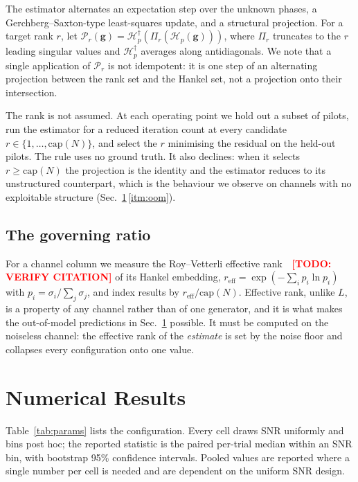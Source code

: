\documentclass[journal]{IEEEtran}
\newcommand{\todo}[1]{\textcolor{red}{\textbf{[TODO: #1]}}}
\newcommand{\bg}{\mathbf{g}}
\newcommand{\Hank}{\mathcal{H}}
\newcommand{\reff}{r_{\mathrm{eff}}}
\begin{document}
The estimator alternates an expectation step over the unknown phases, a
Gerchberg--Saxton-type least-squares update, and a structural projection. For
a target rank $r$, let $\mathcal{P}_r(\bg)=\Hank_p^{\dagger}\!\left(
\Pi_r\!\left(\Hank_p(\bg)\right)\right)$, where $\Pi_r$ truncates to the $r$
leading singular values and $\Hank_p^{\dagger}$ averages along
antidiagonals. We note that a single application of $\mathcal{P}_r$ is not
idempotent: it is one step of an alternating projection between the rank set
and the Hankel set, not a projection onto their intersection.

The rank is not assumed. At each operating point we hold out a subset of
pilots, run the estimator for a reduced iteration count at every candidate
$r\in\{1,\dots,\mathrm{cap}(N)\}$, and select the $r$ minimising the residual
on the held-out pilots. The rule uses no ground truth. It also declines: when
it selects $r\ge \mathrm{cap}(N)$ the projection is the identity and the
estimator reduces to its unstructured counterpart, which is the behaviour we
observe on channels with no exploitable structure
(Sec.~\ref{sec:results}\,\ref{itm:oom}).

\subsection{The governing ratio}

For a channel column we measure the Roy--Vetterli effective
rank~\cite{royvetterli2007}~\todo{VERIFY CITATION} of its Hankel embedding,
$\reff=\exp(-\sum_i p_i \ln p_i)$ with $p_i=\sigma_i/\sum_j\sigma_j$, and
index results by $\reff/\mathrm{cap}(N)$. Effective rank, unlike $L$, is a
property of any channel rather than of one generator, and it is what makes the
out-of-model predictions in Sec.~\ref{sec:results} possible. It must be
computed on the noiseless channel: the effective rank of the \emph{estimate}
is set by the noise floor and collapses every configuration onto one value.

\section{Numerical Results}
\label{sec:results}

Table~\ref{tab:params} lists the configuration. Every cell draws SNR uniformly
and bins post hoc; the reported statistic is the paired per-trial median
within an SNR bin, with bootstrap 95\% confidence intervals. Pooled values are
reported where a single number per cell is needed and are dependent on the
uniform SNR design.
\end{document}

